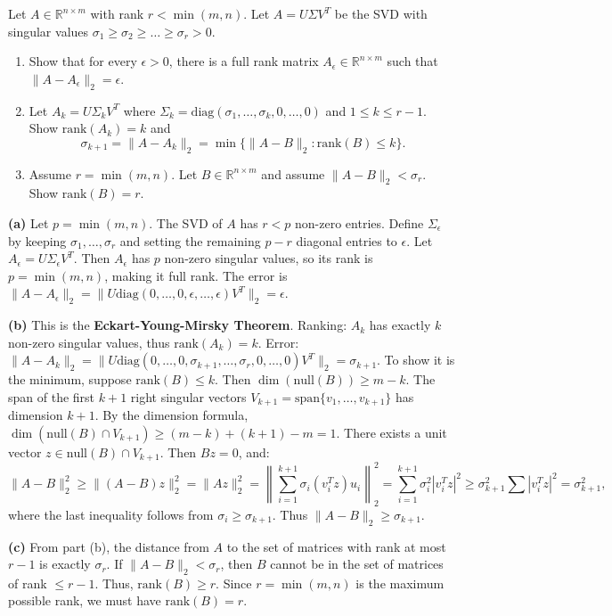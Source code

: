 \begin{exercise}
\label{applied:2015:10}
Let $A\in\mathbb{R}^{n\times m}$ with rank $r<\min(m,n)$. Let $A=U\Sigma V^{T}$ be the SVD with singular values $\sigma_{1}\geq\sigma_{2}\geq\dots\geq\sigma_{r}>0$.

\begin{enumerate}
\item[(a)] Show that for every $\epsilon>0$, there is a full rank matrix $A_{\epsilon}\in\mathbb{R}^{n\times m}$ such that $\|A-A_{\epsilon}\|_{2}=\epsilon$.
\item[(b)] Let $A_{k}=U\Sigma_{k}V^{T}$ where $\Sigma_{k}=\mathrm{diag}(\sigma_{1},\dots,\sigma_{k},0,\dots,0)$ and $1\leq k\leq r-1$. Show $\mathrm{rank}(A_{k})=k$ and
\[
\sigma_{k+1}=\|A-A_{k}\|_{2}=\min\{\|A-B\|_{2}:\mathrm{rank}(B)\leq k\}.
\]
\item[(c)] Assume $r=\min(m,n)$. Let $B\in\mathbb{R}^{n\times m}$ and assume $\|A-B\|_{2}<\sigma_{r}$. Show $\mathrm{rank}(B)=r$.
\end{enumerate}
\end{exercise}

\begin{solution}
\textbf{(a)} Let $p = \min(m, n)$. The SVD of $A$ has $r < p$ non-zero entries. Define $\Sigma_\epsilon$ by keeping $\sigma_1, \dots, \sigma_r$ and setting the remaining $p-r$ diagonal entries to $\epsilon$. Let $A_\epsilon = U \Sigma_\epsilon V^T$. Then $A_\epsilon$ has $p$ non-zero singular values, so its rank is $p = \min(m,n)$, making it full rank.
The error is $\|A - A_\epsilon\|_2 = \|U \text{diag}(0, \dots, 0, \epsilon, \dots, \epsilon) V^T\|_2 = \epsilon$.

\textbf{(b)} This is the \textbf{Eckart-Young-Mirsky Theorem}.
Ranking: $A_k$ has exactly $k$ non-zero singular values, thus $\text{rank}(A_k) = k$.
Error: $\|A-A_k\|_2 = \|U \text{diag}(0, \dots, 0, \sigma_{k+1}, \dots, \sigma_r, 0, \dots, 0) V^T\|_2 = \sigma_{k+1}$.
To show it is the minimum, suppose $\text{rank}(B) \leq k$. Then $\dim(\text{null}(B)) \geq m-k$.
The span of the first $k+1$ right singular vectors $V_{k+1} = \text{span}\{v_1, \dots, v_{k+1}\}$ has dimension $k+1$.
By the dimension formula, $\dim(\text{null}(B) \cap V_{k+1}) \geq (m-k) + (k+1) - m = 1$.
There exists a unit vector $z \in \text{null}(B) \cap V_{k+1}$. Then $Bz = 0$, and:
\[
\|A-B\|_2^2 \geq \|(A-B)z\|_2^2 = \|Az\|_2^2 = \left\| \sum_{i=1}^{k+1} \sigma_i (v_i^T z) u_i \right\|_2^2 = \sum_{i=1}^{k+1} \sigma_i^2 |v_i^T z|^2 \geq \sigma_{k+1}^2 \sum |v_i^T z|^2 = \sigma_{k+1}^2,
\]
where the last inequality follows from $\sigma_i \geq \sigma_{k+1}$. Thus $\|A-B\|_2 \geq \sigma_{k+1}$.

\textbf{(c)} From part (b), the distance from $A$ to the set of matrices with rank at most $r-1$ is exactly $\sigma_r$.
If $\|A-B\|_2 < \sigma_r$, then $B$ cannot be in the set of matrices of rank $\leq r-1$.
Thus, $\text{rank}(B) \geq r$. Since $r = \min(m, n)$ is the maximum possible rank, we must have $\text{rank}(B) = r$.
\end{solution}
